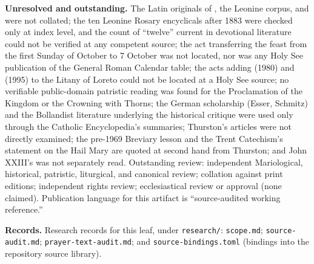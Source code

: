 \textbf{Unresolved and outstanding.} The Latin originals of
, the Leonine corpus, and 
were not collated; the ten Leonine Rosary encyclicals after 1883 were
checked only at index level, and the count of ``twelve'' current in
devotional literature could not be verified at any competent source; the
act transferring the feast from the first Sunday of October to 7 October
was not located, nor was any Holy See publication of the General Roman
Calendar table; the acts adding  (1980) and
 (1995) to the Litany of Loreto could not be
located at a Holy See source; no verifiable public-domain patristic
reading was found for the Proclamation of the Kingdom or the Crowning
with Thorns; the German scholarship (Esser, Schmitz) and the Bollandist
literature underlying the historical critique were used only through the
Catholic Encyclopedia's summaries; Thurston's  articles
were not directly examined; the pre-1969 Breviary lesson and the Trent
Catechism's statement on the Hail Mary are quoted at second hand from
Thurston; and John XXIII's  was not
separately read. Outstanding review: independent Mariological,
historical, patristic, liturgical, and canonical review; collation
against print editions; independent rights review; ecclesiastical review
or approval (none claimed). Publication language for this artifact is
``source-audited working reference.''

\textbf{Records.} Research records for this leaf, under
\texttt{research/}: \texttt{scope.md}; \texttt{source-audit.md};
\texttt{prayer-text-audit.md}; and \texttt{source-bindings.toml}
(bindings into the repository source library).
